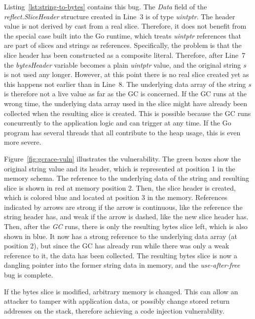 Listing~\ref{lst:string-to-bytes} contains this bug.
The \textit{Data} field of the \textit{reflect.SliceHeader} structure created in Line~3 is of type \textit{uintptr}.
The header value is not derived by cast from a real slice.
Therefore, it does not benefit from the special case built into the Go runtime, which treats \textit{uintptr} references
that are part of slices and strings as references.
Specifically, the problem is that the slice header has been constructed as a composite literal.
Therefore, after Line~7 the \textit{bytesHeader} variable becomes a plain \textit{uintptr} value, and the
original string \textit{s} is not used any longer.
However, at this point there is no real slice created yet as this happens not earlier than in Line~8.
The underlying data array of the string \textit{s} is therefore not a live value as far as the \acrshort{GC} is
concerned.
If the \acrshort{GC} runs at the wrong time, the underlying data array used in the slice might have already been
collected when the resulting slice is created.
This is possible because the \acrshort{GC} runs concurrently to the application logic and can trigger at any time.
If the Go program has several threads that all contribute to the heap usage, this is even more severe.



Figure~\ref{fig:gcrace-vuln} illustrates the vulnerability.
The green boxes show the original string value and its header, which is represented at position 1 in the memory schema.
The reference to the underlying data of the string and resulting slice is shown in red at memory position 2.
Then, the slice header is created, which is colored blue and located at position 3 in the memory.
References indicated by arrows are strong if the arrow is continuous, like the reference the string header has, and
weak if the arrow is dashed, like the new slice header has.
Then, after the \textit{GC} runs, there is only the resulting bytes slice left, which is also shown in blue.
It now has a strong reference to the underlying data array (at position 2), but since the \acrshort{GC} has already run
while there was only a weak reference to it, the data has been collected.
The resulting bytes slice is now a dangling pointer into the former string data in memory, and the
\textit{use-after-free} bug is complete.

If the bytes slice is modified, arbitrary memory is changed.
This can allow an attacker to tamper with application data, or possibly change stored return addresses on the stack,
therefore achieving a code injection vulnerability.


